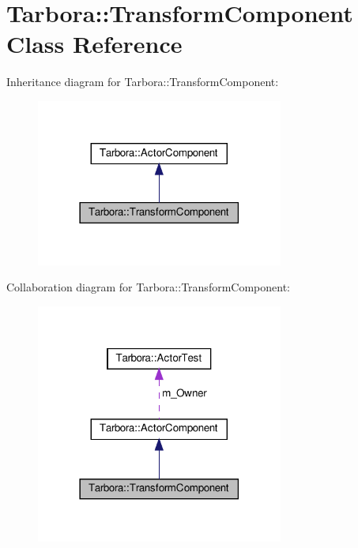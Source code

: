 \hypertarget{classTarbora_1_1TransformComponent}{}\section{Tarbora\+:\+:Transform\+Component Class Reference}
\label{classTarbora_1_1TransformComponent}


Inheritance diagram for Tarbora\+:\+:Transform\+Component\+:\nopagebreak
\begin{figure}[H]
\begin{center}
\leavevmode
\includegraphics[width=230pt]{classTarbora_1_1TransformComponent__inherit__graph}
\end{center}
\end{figure}


Collaboration diagram for Tarbora\+:\+:Transform\+Component\+:\nopagebreak
\begin{figure}[H]
\begin{center}
\leavevmode
\includegraphics[width=230pt]{classTarbora_1_1TransformComponent__coll__graph}
\end{center}
\end{figure}

